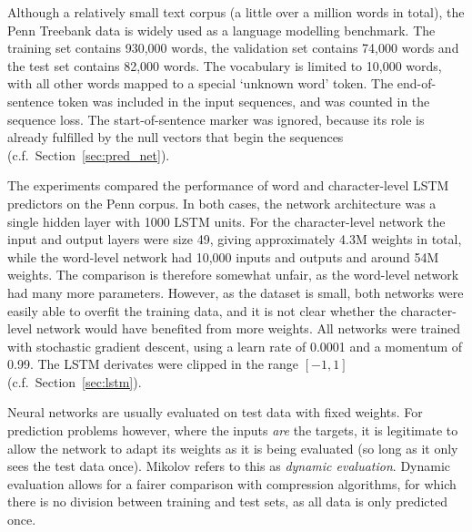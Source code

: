 Although a relatively small text corpus (a little over a million words in total), the Penn Treebank data is widely used as a language modelling benchmark. The training set contains 930,000 words, the validation set contains 74,000 words and the test set  contains 82,000 words. The vocabulary is limited to 10,000 words, with all other words mapped to a special `unknown word' token. The end-of-sentence token was included in the input sequences, and was counted in the sequence loss. The start-of-sentence marker was ignored, because its role is already fulfilled by the null vectors that begin the sequences (c.f.\  Section~\ref{sec:pred_net}).

The experiments compared the performance of word and character-level LSTM predictors on the Penn corpus. In both cases, the network architecture was a single hidden layer with 1000 LSTM units. For the character-level network the input and output layers were size 49, giving approximately 4.3M weights in total, while the word-level network had 10,000 inputs and outputs and around 54M weights. The comparison is therefore somewhat unfair, as the word-level network had many more parameters. However, as the dataset is small, both networks were easily able to overfit the training data, and it is not clear whether the character-level network would have benefited from more weights. All networks were trained with stochastic gradient descent, using a learn rate of 0.0001 and a momentum of 0.99. The LSTM derivates were clipped in the range $[-1,1]$ (c.f.\  Section~\ref{sec:lstm}).

Neural networks are usually evaluated on test data with fixed weights. For prediction problems however, where the inputs \emph{are} the targets, it is legitimate to allow the network to adapt its weights as it is being evaluated (so long as it only sees the test data once). Mikolov refers to this as \emph{dynamic evaluation}. Dynamic evaluation allows for a fairer comparison with compression algorithms, for which there is no division between training and test sets, as all data is only predicted once.

